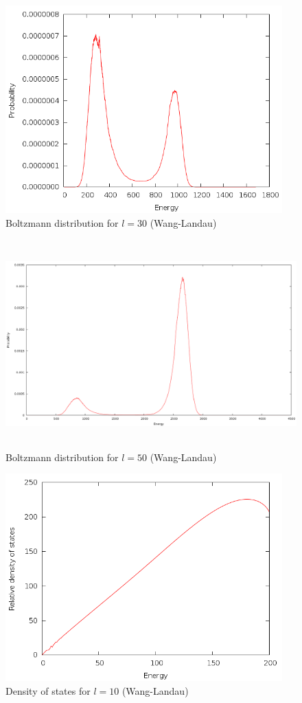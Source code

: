 \documentclass{article}
\begin{document}
\begin{figure}[h]
\includegraphics[height=8cm]{../results/wanglandau/b30.png}
\caption{Boltzmann distribution for $l = 30$ (Wang-Landau)}
\label{fig:b30}
\end{figure}

\begin{figure}[h]
\includegraphics[height=8cm]{../results/wanglandau/b50.png}
\caption{Boltzmann distribution for $l = 50$ (Wang-Landau)}
\label{fig:b50}
\end{figure}

\begin{figure}[h]
\includegraphics[height=8cm]{../results/wanglandau/s10.png}
\caption{Density of states for $l = 10$ (Wang-Landau)}
\label{fig:s10}
\end{figure}
\end{document}
